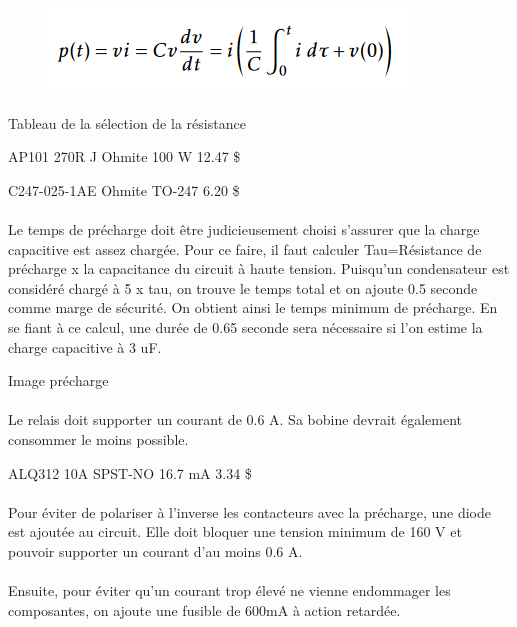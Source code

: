 		\begin{figure}[H]
			\centering
			\includegraphics[width=0.4\linewidth]{../Images/CalculPuissancePrecharge}
		\end{figure}
		
		
		Tableau de la sélection de la résistance
		
		AP101 270R J 
		Ohmite
		100 W
		12.47 \$
		
		C247-025-1AE
		Ohmite
		TO-247
		6.20 \$

		\paragraph*{}		
		Le temps de précharge doit être judicieusement choisi s'assurer que la charge capacitive est assez chargée. Pour ce faire, il faut calculer Tau=Résistance de précharge x la capacitance du circuit à haute tension. Puisqu'un condensateur est considéré chargé à 5 x tau, on trouve le temps total et on ajoute 0.5 seconde comme marge de sécurité. On obtient ainsi le temps minimum de précharge. En se fiant à ce calcul, une durée de 0.65 seconde sera nécessaire si l'on estime la charge capacitive à 3 uF.

		Image précharge
		
		\paragraph*{}		
		Le relais doit supporter un courant de 0.6 A. Sa bobine devrait également consommer le moins possible. 
		
		
		ALQ312
		10A
		SPST-NO
		16.7 mA
		3.34 \$
		
	
		\paragraph*{}	
		Pour éviter de polariser à l'inverse les contacteurs avec la précharge, une diode est ajoutée au circuit. Elle doit bloquer une tension minimum de 160 V et pouvoir supporter un courant d'au moins 0.6 A. 
		
		\paragraph*{}			
		Ensuite, pour éviter qu'un courant trop élevé ne vienne endommager les composantes, on ajoute une fusible de 600mA à action retardée. 
		
		
		\begin{figure}[H]
			\centering
			\caption[Schéma circuit résistance de précharge]{}
			\label{fig:circuitprecharge}
		\end{figure}
			
		
